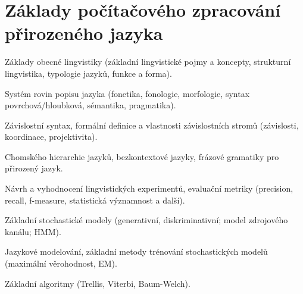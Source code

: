 \newpage
\section{Základy počítačového zpracování přirozeného jazyka}
\begin{pozadavky}
\begin{pitemize}
\item Základy obecné lingvistiky (základní lingvistické pojmy a koncepty, strukturní lingvistika, typologie jazyků, funkce a forma).
\item Systém rovin popisu jazyka (fonetika, fonologie, morfologie, syntax povrchová/hloubková, sémantika, pragmatika).
\item Závislostní syntax, formální definice a vlastnosti závislostních stromů (závislosti, koordinace, projektivita).
\item Chomského hierarchie jazyků, bezkontextové jazyky, frázové gramatiky pro přirozený jazyk.
\item Návrh a vyhodnocení lingvistických experimentů, evaluační metriky (precision, recall, f-measure, statistická významnost a další).
\item Základní stochastické modely (generativní, diskriminativní; model zdrojového kanálu; HMM).
\item Jazykové modelování, základní metody trénování stochastických modelů (maximální věrohodnost, EM).
\item Základní algoritmy (Trellis, Viterbi, Baum-Welch).
\end{pitemize}
\end{pozadavky}